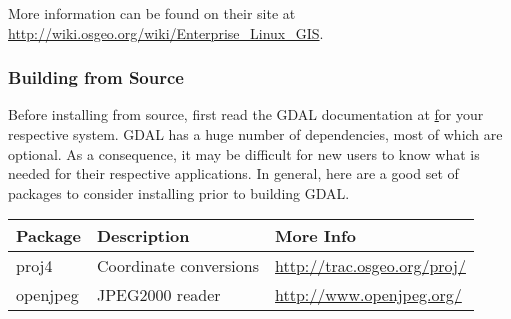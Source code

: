 More information can be found on their site at \url{http://wiki.osgeo.org/wiki/Enterprise_Linux_GIS}.

\subsubsection*{Building from Source}

Before installing from source, first read the GDAL documentation 
at \href{http://gdal.org} for your respective system.  GDAL 
has a huge number of dependencies, most of which are optional. 
As a consequence, it may be difficult for new users to know what is needed
for their respective applications.  In general, here are a good set of
packages to consider installing prior to building GDAL.

\begin{table}[h!]
\begin{tabular}{|l|l|l|}\hline
\textbf{Package} & \textbf{Description}   & \textbf{More Info} \\\hline
proj4            & Coordinate conversions & \url{http://trac.osgeo.org/proj/} \\\hline
openjpeg         & JPEG2000 reader        & \url{http://www.openjpeg.org/} \\\hline
\end{tabular}
\end{table}

